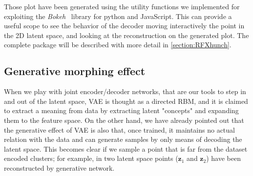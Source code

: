 Those plot have been generated using the utility functions we implemented for \RFXhunch exploiting the \textit{Bokeh}~\cite{bokeh} library for python and JavaScript. This can provide a useful scope to see the behavior of the decoder moving interactively the point in the 2D latent space, and looking at the reconstruction on the generated plot.
The complete \RFXhunch package will be described with more detail in \cref{section:RFXhunch}.
%
\subsection{Generative morphing effect}
When we play with joint encoder/decoder networks, that are our tools to step in and out of the latent space, \acs{VAE} is thought as a directed \acs{RBM}, and it is claimed to extract a meaning from data by extracting latent "concepts" and expanding them to the feature space. On the other hand, we have already pointed out that the generative effect of \acs{VAE} is also that, once trained, it maintains no actual relation with the data and can generate samples by only means of decoding the latent space. This becomes clear if we sample a point that is far from the dataset encoded clusters; for example, in \Figure{\ref{fig:step1_morph}} two latent space points ($\bm{z}_1$ and $\bm{z}_2$) have been reconstructed by generative network. 
%
